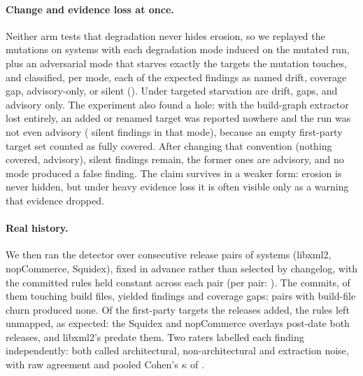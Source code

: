 \paragraph{Change and evidence loss at once.} Neither arm tests that degradation never hides
erosion, so we replayed the \rqSixCombMutations{} mutations on \rqSixCombSystems{} systems
with each degradation mode induced on the mutated run, plus an adversarial mode that starves
exactly the targets the mutation touches, and classified, per mode, each of the
\rqSixCombFindings{} expected findings as named drift, coverage gap, advisory-only, or silent (\trDrift{}). Under
targeted starvation \rqSixCombStarveMutatedDrift{} are drift, \rqSixCombStarveMutatedGap{} gaps,
and \rqSixCombStarveMutatedAdvisory{} advisory only. The experiment also found a hole: with the
build-graph extractor lost entirely, an added or renamed target was reported nowhere and the run
was not even advisory (\rqSixCombPrefixSilentTotal{} silent findings in that mode), because an empty
first-party target set counted as fully covered. After changing that convention (nothing covered,
advisory), \rqSixCombSilentTotal{} silent findings remain, the \rqSixCombLoseLZeroAdvisory{}
former ones are advisory, and no mode produced a false finding. The claim survives in a weaker
form: erosion is never hidden, but under heavy evidence loss it is often visible only as a warning
that evidence dropped.

\paragraph{Real history.} We then ran the detector over \rqSixHistPairs{} consecutive release pairs
of \rqSixHistSystems{} systems (libxml2, nopCommerce, Squidex), fixed in advance rather than
selected by changelog, with the committed rules held constant across each pair (per pair:
\trDrift{}). The \rqSixHistCommits{} commits, \rqSixHistBuildCommits{} of them touching build
files, yielded \rqSixHistFindings{} findings and \rqSixHistCoverageGaps{} coverage gaps;
\rqSixHistPairsZero{} pairs with build-file churn produced none. Of the \rqSixHistNewTargets{} first-party targets the releases added, the rules left
\rqSixHistNewUnmapped{} unmapped, as expected: the Squidex and nopCommerce overlays post-date both
releases, and libxml2's predate them. Two raters labelled each finding independently: both
called \rqSixHistArchitectural{} architectural, \rqSixHistNonArchitectural{} non-architectural and
\rqSixHistNoise{} extraction noise, with raw agreement \rqSixHistLabelsAgree{} and pooled
Cohen's $\kappa$ of \rqSixHistLabelsKappa{}.

